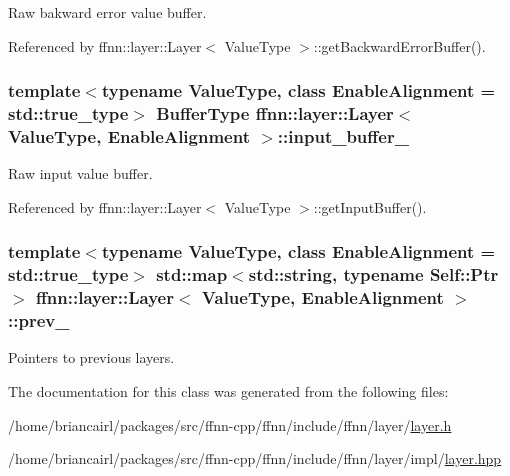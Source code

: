 Raw bakward error value buffer. 



Referenced by ffnn\-::layer\-::\-Layer$<$ Value\-Type $>$\-::get\-Backward\-Error\-Buffer().

\hypertarget{classffnn_1_1layer_1_1_layer_a8595d0898a1530aaec71aec487037655}{
\subsubsection[{input\-\_\-buffer\-\_\-}]{\setlength{\rightskip}{0pt plus 5cm}template$<$typename Value\-Type, class Enable\-Alignment = std\-::true\-\_\-type$>$ {\bf Buffer\-Type} {\bf ffnn\-::layer\-::\-Layer}$<$ Value\-Type, Enable\-Alignment $>$\-::input\-\_\-buffer\-\_\-\hspace{0.3cm}{\ttfamily [protected]}}}\label{classffnn_1_1layer_1_1_layer_a8595d0898a1530aaec71aec487037655}


Raw input value buffer. 



Referenced by ffnn\-::layer\-::\-Layer$<$ Value\-Type $>$\-::get\-Input\-Buffer().

\hypertarget{classffnn_1_1layer_1_1_layer_ad665f209da80c13770f2b6a790d3ed4f}{
\subsubsection[{prev\-\_\-}]{\setlength{\rightskip}{0pt plus 5cm}template$<$typename Value\-Type, class Enable\-Alignment = std\-::true\-\_\-type$>$ std\-::map$<$std\-::string, typename {\bf Self\-::\-Ptr}$>$ {\bf ffnn\-::layer\-::\-Layer}$<$ Value\-Type, Enable\-Alignment $>$\-::prev\-\_\-\hspace{0.3cm}{\ttfamily [protected]}}}\label{classffnn_1_1layer_1_1_layer_ad665f209da80c13770f2b6a790d3ed4f}


Pointers to previous layers. 



The documentation for this class was generated from the following files\-:\begin{DoxyCompactItemize}
\item 
/home/briancairl/packages/src/ffnn-\/cpp/ffnn/include/ffnn/layer/\hyperlink{layer_8h}{layer.\-h}\item 
/home/briancairl/packages/src/ffnn-\/cpp/ffnn/include/ffnn/layer/impl/\hyperlink{layer_8hpp}{layer.\-hpp}\end{DoxyCompactItemize}
